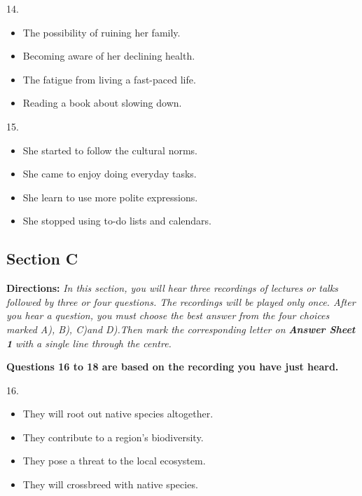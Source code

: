 \documentclass[UTF8,11pt]{ctexart}
\begin{document}
14.


\begin{itemize}[leftmargin=2em,itemsep=.2em,topsep=.4em]\item[A.] The possibility of ruining her family.
\item[B.] Becoming aware of her declining health.
\item[C.] The fatigue from living a fast-paced life.
\item[D.] Reading a book about slowing down.
\end{itemize}

15.


\begin{itemize}[leftmargin=2em,itemsep=.2em,topsep=.4em]\item[A.] She started to follow the cultural norms.
\item[B.] She came to enjoy doing everyday tasks.
\item[C.] She learn to use more polite expressions.
\item[D.] She stopped using to-do lists and calendars.
\end{itemize}

\subsection*{\textbf{Section C}}


\textbf{Directions:}\textit{ In this section, you will hear three recordings of lectures or talks followed by three or four} \textit{questions. The recordings will be played only once. After you hear a question, you must choose the best answer} \textit{from the four choices marked A), B), C)and D).Then mark the corresponding letter on}\textbf{\textit{ Answer Sheet 1}}\textit{ with} \textit{a single line through the centre.}


\textbf{Questions 16 to 18 are based on the recording you have just heard.}


16.


\begin{itemize}[leftmargin=2em,itemsep=.2em,topsep=.4em]\item[A.] They will root out native species altogether.
\item[B.] They contribute to a region's biodiversity.
\item[C.] They pose a threat to the local ecosystem.
\item[D.] They will crossbreed with native species.
\end{itemize}
\end{document}
